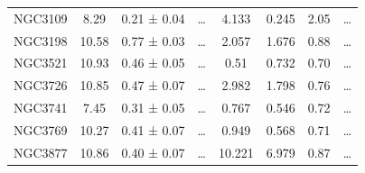 \documentclass[reprint,%
 amsmath,amssymb,
 aps,
]{revtex4-1}
\begin{document}
\begin{table}[]
\begin{tabular}{cccccrrc}
\rowcolor[HTML]{F3F3F3} 
NGC3109              & 8.29                      & 0.21 ± 0.04           & …                      & 4.133                                                        & 0.245                                                          & 2.05                                                            & …                                                             \\
\rowcolor[HTML]{F3F3F3} 
NGC3198              & 10.58                     & 0.77 ± 0.03           & …                      & 2.057                                                        & 1.676                                                           & 0.88                                                          & …                                                             \\
\rowcolor[HTML]{F3F3F3} 
NGC3521              & 10.93                     & 0.46 ± 0.05           & …                      & 0.51                                                         & 0.732                                                          & 0.70                                                          & …                                                             \\
\rowcolor[HTML]{F3F3F3} 
NGC3726              & 10.85                     & 0.47 ± 0.07           & …                      & 2.982                                                        & 1.798                                                          & 0.76                                                          & …                                                             \\
\rowcolor[HTML]{F3F3F3} 
NGC3741              & 7.45                      & 0.31 ± 0.05           & …                      & 0.767                                                        & 0.546                                                          & 0.72                                                           & …                                                             \\
\rowcolor[HTML]{F3F3F3} 
NGC3769              & 10.27                     & 0.41 ± 0.07           & …                      & 0.949                                                        & 0.568                                                           & 0.71                                                          & …                                                             \\
\rowcolor[HTML]{F3F3F3} 
NGC3877              & 10.86                     & 0.40 ± 0.07           & …                      & 10.221                                                       & 6.979                                                          & 0.87                                                          & …                                                             \\

\end{tabular}
\end{table}
\end{document}
